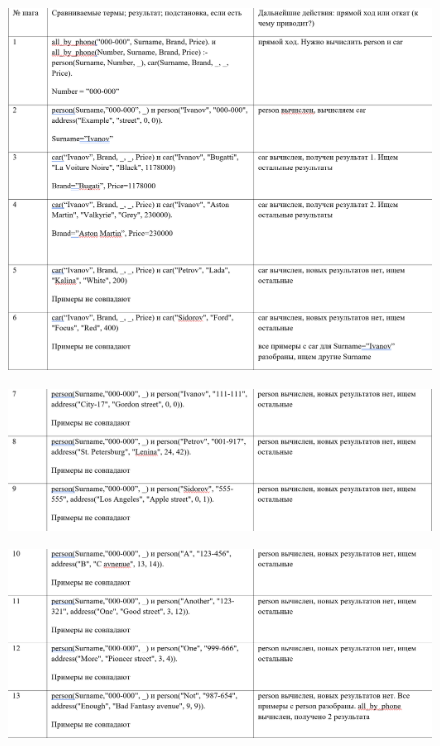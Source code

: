 \documentclass[a4paper, 12pt]{article}
\begin{document}
\begin{figure}[h!]
	\centering \includegraphics[scale=0.8]{3.1}
\end{figure}
\begin{figure}[h!]
	\centering \includegraphics[scale=0.8]{3.2}
\end{figure}
\clearpage
\newpage
\begin{figure}[h!]
	\centering \includegraphics[scale=0.8]{3.3}
\end{figure}
\end{document}
